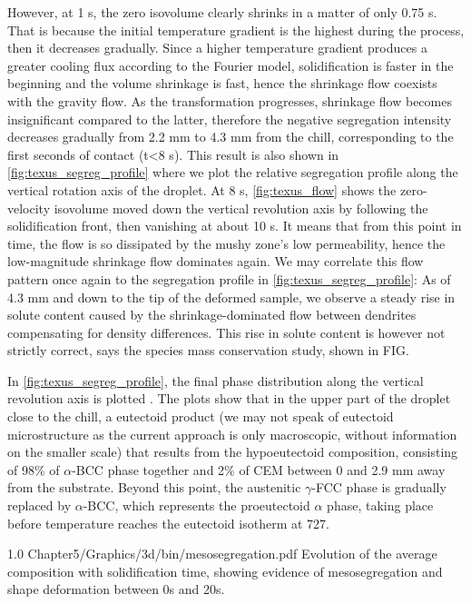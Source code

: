 However, at 1 s, the zero isovolume clearly shrinks in a matter of only 0.75 s. That is
because the initial temperature gradient is the highest during the process, then it decreases gradually. 
Since a higher temperature gradient produces a greater cooling flux according to the Fourier model, solidification is faster
in the beginning and the volume shrinkage is fast, hence the shrinkage flow coexists with the gravity flow. As the transformation
progresses, shrinkage flow becomes insignificant compared to the latter, therefore the negative segregation intensity decreases gradually from 2.2 mm
to 4.3 mm from the chill, corresponding to the first seconds of contact (t<8 s).
This result is also shown in \cref{fig:texus_segreg_profile} where we plot the relative segregation profile along the vertical rotation axis of the droplet.
At 8 s, \cref{fig:texus_flow} shows the zero-velocity isovolume moved down the vertical revolution axis by following
the solidification front, then vanishing at about 10 s. It means that from this point in time, the flow is so dissipated by the mushy zone's low permeability,
hence the low-magnitude shrinkage flow dominates again.
We may correlate this flow pattern once again to the segregation profile in \cref{fig:texus_segreg_profile}:
As of 4.3 mm and down to the tip of the deformed sample, we observe a steady rise in solute content caused 
by the shrinkage-dominated flow between dendrites compensating for density differences. 
This rise in solute content is however not strictly correct, says the species mass conservation study, shown in FIG.

In \cref{fig:texus_segreg_profile}, the final phase distribution along the vertical revolution axis is plotted .
The plots show that in the upper part of the droplet close to the chill, a eutectoid product (we may not speak of eutectoid microstructure as the current approach is only macroscopic, without
information on the smaller scale) that results from the hypoeutectoid composition, consisting of 98\% of $\alpha$-BCC phase together and 2\% of CEM between 0 and 2.9 mm away from the substrate.
Beyond this point, the austenitic $\gamma$-FCC phase is gradually replaced by $\alpha$-BCC, which represents the proeutectoid $\alpha$ phase, taking place before temperature
reaches the eutectoid isotherm at \SI{727}{\udegC}.

\begin{figureth}
{1.0}
{Chapter5/Graphics/3d/bin/mesosegregation.pdf}
{Evolution of the average composition with solidification time, showing evidence of mesosegregation and shape deformation between 0s and 20s.}
\label{fig:texus_mesoseg}
\end{figureth}

